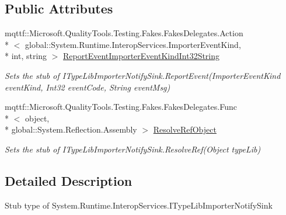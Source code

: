 \subsection*{Public Attributes}
\begin{DoxyCompactItemize}
\item 
mqttf\-::\-Microsoft.\-Quality\-Tools.\-Testing.\-Fakes.\-Fakes\-Delegates.\-Action\\*
$<$ global\-::\-System.\-Runtime.\-Interop\-Services.\-Importer\-Event\-Kind, \\*
int, string $>$ \hyperlink{class_system_1_1_runtime_1_1_interop_services_1_1_fakes_1_1_stub_i_type_lib_importer_notify_sink_ae2d828e35de61e2392c3e20b85ddc328}{Report\-Event\-Importer\-Event\-Kind\-Int32\-String}
\begin{DoxyCompactList}\small\item\em Sets the stub of I\-Type\-Lib\-Importer\-Notify\-Sink.\-Report\-Event(\-Importer\-Event\-Kind event\-Kind, Int32 event\-Code, String event\-Msg)\end{DoxyCompactList}\item 
mqttf\-::\-Microsoft.\-Quality\-Tools.\-Testing.\-Fakes.\-Fakes\-Delegates.\-Func\\*
$<$ object, \\*
global\-::\-System.\-Reflection.\-Assembly $>$ \hyperlink{class_system_1_1_runtime_1_1_interop_services_1_1_fakes_1_1_stub_i_type_lib_importer_notify_sink_a0568812bf87c5fe7acf54ab952dd07df}{Resolve\-Ref\-Object}
\begin{DoxyCompactList}\small\item\em Sets the stub of I\-Type\-Lib\-Importer\-Notify\-Sink.\-Resolve\-Ref(\-Object type\-Lib)\end{DoxyCompactList}\end{DoxyCompactItemize}


\subsection{Detailed Description}
Stub type of System.\-Runtime.\-Interop\-Services.\-I\-Type\-Lib\-Importer\-Notify\-Sink



